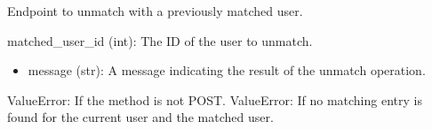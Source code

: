 \documentclass[letterpaper,10pt,english]{sphinxmanual}
\begin{document}
\begin{fulllineitems}
\label{\detokenize{routes.feed:routes.feed.routes.unmatch}}
\pysigstartsignatures
{}
\pysigstopsignatures
\sphinxAtStartPar
Endpoint to unmatch with a previously matched user.
\begin{description}
\sphinxAtStartPar
matched\_user\_id (int): The ID of the user to unmatch.

\begin{description}
\begin{itemize}
\item {} 
\sphinxAtStartPar
message (str): A message indicating the result of the unmatch operation.

\end{itemize}

\end{description}

\sphinxAtStartPar
ValueError: If the method is not POST.
ValueError: If no matching entry is found for the current user and the matched user.

\end{description}

\end{fulllineitems}

\end{document}
